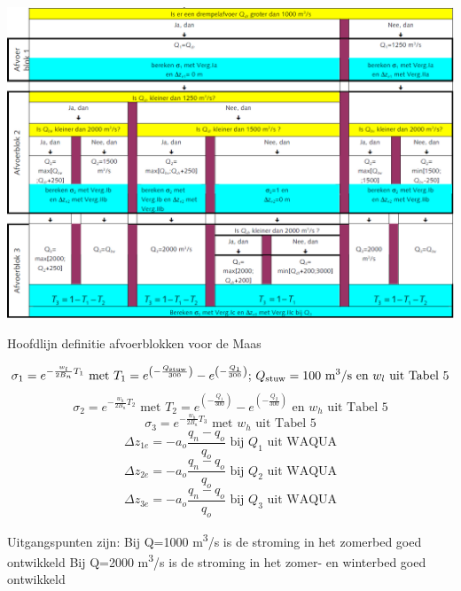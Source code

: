 \begin{table}
\includegraphics[width=\columnwidth]{figures/Tab8.png}
\caption{Hoofdlijn definitie afvoerblokken voor de Maas}
\label{Tab8}
\end{table}
%
\begin{equation}
\sigma_1 = e^{-\frac{w_l}{2 B_n} T_1} \text{ met } T_1 = e^{\left ( - \frac{Q_\text{stuw}}{300} \right )} - e^{\left ( - \frac{Q_1}{300} \right )} \text{; $Q_\text{stuw} = 100$ m\textsuperscript{3}/s en $w_l$ uit Tabel 5}
\end{equation}
%
\begin{equation}
\sigma_2 = e^{-\frac{w_h}{2 B_n} T_2} \text{ met } T_2 = e^{\left ( - \frac{Q_1}{300} \right )} - e^{\left ( - \frac{Q_2}{300} \right )} \text{ en $w_h$ uit Tabel 5}
\end{equation}
%
\begin{equation}
\sigma_3 = e^{-\frac{w_h}{2 B_n} T_3} \text{ met $w_h$ uit Tabel 5}
\end{equation}
%
\begin{equation}
\Delta z_{1e} = -a_o \frac{q_n - q_o}{q_o} \text{ bij $Q_1$ uit WAQUA}
\end{equation}
%
\begin{equation}
\Delta z_{2e} = -a_o \frac{q_n - q_o}{q_o} \text{ bij $Q_2$ uit WAQUA}
\end{equation}
%
\begin{equation}
\Delta z_{3e} = -a_o \frac{q_n - q_o}{q_o} \text{ bij $Q_3$ uit WAQUA}
\end{equation}

Uitgangspunten zijn:
Bij Q=1000 m\textsuperscript{3}/s is de stroming in het zomerbed goed ontwikkeld
Bij Q=2000 m\textsuperscript{3}/s is de stroming in het zomer- en winterbed goed ontwikkeld

